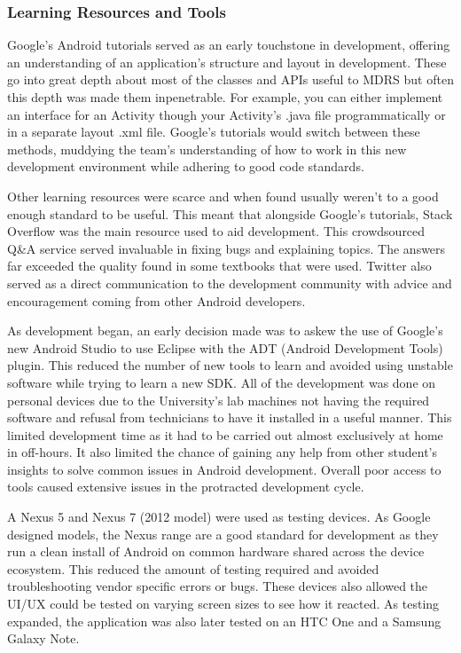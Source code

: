 \documentclass{l3proj}
\begin{document}
\subsubsection{Learning Resources and Tools} Google's Android tutorials served as an early touchstone in development, offering an understanding of an application's structure and layout in development. These go into great depth about most of the classes and APIs useful to MDRS but often this depth was made them inpenetrable. For example, you can either implement an interface for an Activity though your Activity's .java file programmatically or in a separate layout .xml file. Google's tutorials would switch between these methods, muddying the team's understanding of how to work in this new development environment while adhering to good code standards.

Other learning resources were scarce and when found usually weren't to a good enough standard to be useful. This meant that alongside Google's tutorials, Stack Overflow was the main resource used to aid development. This crowdsourced Q&A service served invaluable in fixing bugs and explaining topics. The answers far exceeded the quality found in some textbooks that were used. Twitter also served as a direct communication to the development community with advice and encouragement coming from other Android developers.

As development began, an early decision made was to askew the use of Google's new Android Studio to use Eclipse with the ADT (Android Development Tools) plugin. This reduced the number of new tools to learn and avoided using unstable software while trying to learn a new SDK. All of the development was done on personal devices due to the University's lab machines not having the required software and refusal from technicians to have it installed in a useful manner. This limited development time as it had to be carried out almost exclusively at home in off-hours. It also limited the chance of gaining any help from other student's insights to solve common issues in Android development. Overall poor access to tools caused extensive issues in the protracted  development cycle.

A Nexus 5 and Nexus 7 (2012 model) were used as testing devices. As Google designed models, the Nexus range are a good standard for development as they run a clean install of Android on common hardware shared across the device ecosystem. This reduced the amount of testing required and avoided troubleshooting vendor specific errors or bugs. These devices also allowed the UI/UX could be tested on varying screen sizes to see how it reacted. As testing expanded, the application was also later tested on an HTC One and a Samsung Galaxy Note.
\end{document}
